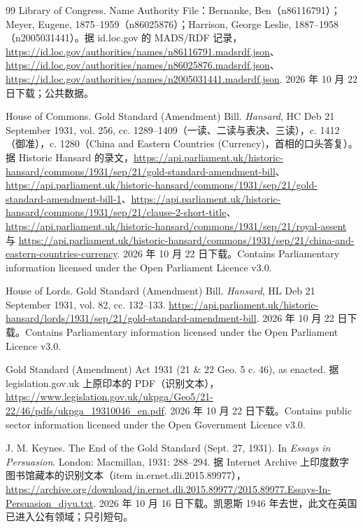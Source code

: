 \begin{thebibliography}{99}
 Library of Congress. Name Authority File：Bernanke, Ben（n86116791）；Meyer, Eugene, 1875--1959（n86025876）；Harrison, George Leslie, 1887--1958（n2005031441）。据 id.loc.gov 的 MADS/RDF 记录，\url{https://id.loc.gov/authorities/names/n86116791.madsrdf.json}、\url{https://id.loc.gov/authorities/names/n86025876.madsrdf.json}、\url{https://id.loc.gov/authorities/names/n2005031441.madsrdf.json}. 2026 年 10 月 22 日下载；公共数据。

 House of Commons. Gold Standard (Amendment) Bill. \emph{Hansard}, HC Deb 21 September 1931, vol. 256, cc. 1289--1409（一读、二读与表决、三读），c. 1412（御准），c. 1280（China and Eastern Countries (Currency)，首相的口头答复）。据 Historic Hansard 的录文，\url{https://api.parliament.uk/historic-hansard/commons/1931/sep/21/gold-standard-amendment-bill}、\url{https://api.parliament.uk/historic-hansard/commons/1931/sep/21/gold-standard-amendment-bill-1}、\url{https://api.parliament.uk/historic-hansard/commons/1931/sep/21/clause-2-short-title}、\url{https://api.parliament.uk/historic-hansard/commons/1931/sep/21/royal-assent} 与 \url{https://api.parliament.uk/historic-hansard/commons/1931/sep/21/china-and-eastern-countries-currency}. 2026 年 10 月 22 日下载。Contains Parliamentary information licensed under the Open Parliament Licence v3.0.

 House of Lords. Gold Standard (Amendment) Bill. \emph{Hansard}, HL Deb 21 September 1931, vol. 82, cc. 132--133. \url{https://api.parliament.uk/historic-hansard/lords/1931/sep/21/gold-standard-amendment-bill}. 2026 年 10 月 22 日下载。Contains Parliamentary information licensed under the Open Parliament Licence v3.0.

 Gold Standard (Amendment) Act 1931 (21 \& 22 Geo. 5 c. 46), as enacted. 据 legislation.gov.uk 上原印本的 PDF（识别文本），\url{https://www.legislation.gov.uk/ukpga/Geo5/21-22/46/pdfs/ukpga_19310046_en.pdf}. 2026 年 10 月 22 日下载。Contains public sector information licensed under the Open Government Licence v3.0.

 J. M. Keynes. The End of the Gold Standard (Sept. 27, 1931). In \emph{Essays in Persuasion}. London: Macmillan, 1931: 288--294. 据 Internet Archive 上印度数字图书馆藏本的识别文本（item in.ernet.dli.2015.89977），\url{https://archive.org/download/in.ernet.dli.2015.89977/2015.89977.Essays-In-Persuasion_djvu.txt}. 2026 年 10 月 16 日下载。凯恩斯 1946 年去世，此文在英国已进入公有领域；只引短句。


\end{thebibliography}
